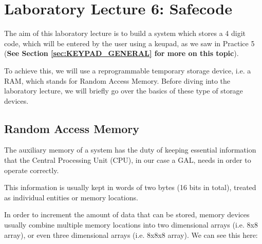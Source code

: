 \section{Laboratory Lecture 6: Safecode}

The aim of this laboratory lecture is to build a system which stores a 4 digit code, which will be entered by the user using a keupad, as we saw in Practice 5 (\textbf{See Section \ref{sec:KEYPAD_GENERAL} for more on this topic}).\medskip

To achieve this, we will use a reprogrammable temporary storage device, i.e. a RAM, which stands for Random Access Memory. Before diving into the laboratory lecture, we will briefly go over the basics of these type of storage devices.

\subsection{Random Access Memory}

The auxiliary memory of a system has the duty of keeping essential information that the Central Processing Unit (CPU), in our case a GAL, needs in order to operate correctly.\medskip

This information is usually kept in words of two bytes (16 bits in total), treated as individual entities or memory locations.\medskip

In order to increment the amount of data that can be stored, memory devices usually combine multiple memory locations into two dimensional arrays (i.e. 8x8 array), or even three dimensional arrays (i.e. 8x8x8 array). We can see this here:\medskip

